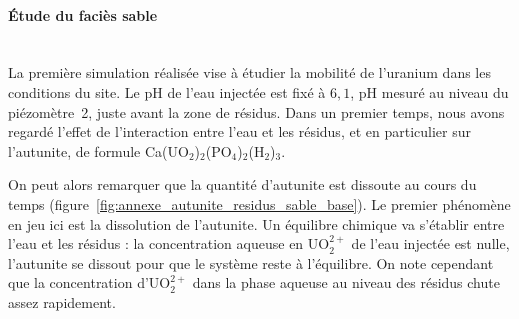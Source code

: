\documentclass{article}
\begin{document}

\paragraph{Étude du faciès sable \\ \\}
La première simulation réalisée vise à étudier la mobilité de l’uranium dans les conditions du site. Le pH de l’eau injectée est fixé à $6,1$, pH mesuré au niveau du piézomètre~2, juste avant la zone de résidus. Dans un premier temps, nous avons regardé l’effet de l'interaction entre l’eau et les résidus, et en particulier sur l’autunite, de formule Ca(UO$_2$)$_2$(PO$_4$)$_2$(H$_2$)$_3$.

On peut alors remarquer que la quantité d’autunite est dissoute au cours du temps (figure~\ref{fig:annexe_autunite_residus_sable_base}). Le premier phénomène en jeu ici est la dissolution de l’autunite. Un équilibre chimique va s’établir entre l’eau et les résidus : la concentration aqueuse en UO$_2^{2+}$ de l’eau injectée est nulle, l’autunite se dissout pour que le système reste à l’équilibre. On note cependant que la concentration d'UO$_2^{2+}$ dans la phase aqueuse au niveau des résidus chute assez rapidement.
\end{document}
